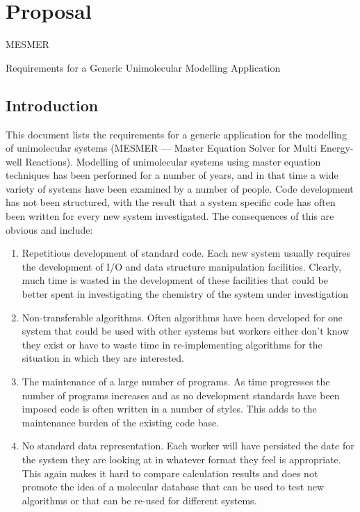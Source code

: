 \chapter{Proposal}\label{sec:Proposal}


MESMER

Requirements for a Generic Unimolecular Modelling Application

\section{Introduction}\label{sec:Introduction}

This document lists the requirements for a generic application for the modelling of unimolecular systems (MESMER --- Master Equation Solver for Multi Energy-well Reactions). Modelling of unimolecular systems using master equation techniques has been performed for a number of years, and in that time a wide variety of systems have been examined by a number of people. Code development has not been structured, with the result that a system specific code has often been written for every new system investigated. The consequences of this are obvious and include:


\begin{enumerate}
  \item  Repetitious development of standard code. Each new system usually requires the development of I/O and data structure manipulation facilities. Clearly, much time is wasted in the development of these facilities that could be better spent in investigating the chemistry of the system under investigation
  \item  Non-transferable algorithms. Often algorithms have been developed for one system that could be used with other systems but workers either don't know they exist or have to waste time in re-implementing algorithms for the situation in which they are interested.
  \item  The maintenance of a large number of programs. As time progresses the number of programs increases and as no development standards have been imposed code is often written in a number of styles. This adds to the maintenance burden of the existing code base.
  \item  No standard data representation. Each worker will have persisted the date for the system they are looking at in whatever format they feel is appropriate. This again makes it hard to compare calculation results and does not promote the idea of a molecular database that can be used to test new algorithms or that can be re-used for different systems.
\end{enumerate}

